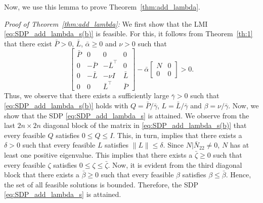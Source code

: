 \documentclass[9pt,shortpaper,twoside,web]{ieeecolor}
\newcommand{\bbma}{\begin{bmatrix}}
\newcommand{\ebma}{\end{bmatrix}}
\begin{document}
Now, we use this lemma to prove Theorem~\ref{thm:add_lambda}.

\textit{Proof of Theorem~\ref{thm:add_lambda}:}
 We first show that the LMI \eqref{eq:SDP_add_lambda_s(b)} is feasible. For this, it follows from Theorem~\ref{th:1} that there exist $\bar P>0$, $\bar L$, $\bar \alpha \geq 0$ and $\nu>0$ such that
\begin{equation}
\bbma \bar P & 0 & 0 & 0 \\ 0 & -\bar P & - \bar L^\top &  0 \\ 0 & -\bar L & -\nu I &  \bar L \\ 0 & 0 & \bar L^\top & \bar P \ebma
-\bar \alpha \bbma N & 0\\ 0 & 0 \ebma > 0.
\end{equation}
Thus, we observe that there exists a sufficiently large $\bar \gamma > 0$ such that \eqref{eq:SDP_add_lambda_s(b)} holds with $Q=\bar P/\bar \gamma$, $L=\bar L/\bar \gamma$ and $\beta=\nu/\bar \gamma$. Now, we show that the SDP \eqref{eq:SDP_add_lambda_s} is attained. We observe from the last $2n \times 2n$ diagonal block of the matrix in \eqref{eq:SDP_add_lambda_s(b)} that every feasible $Q$ satisfies $0\leq Q\leq I$. This, in turn, implies that there exists a $\delta>0$ such that every feasible $L$ satisfies $\|L\|\leq \delta$. Since $N|\bar{N}_{22}\neq0$, $N$ has at least one positive eigenvalue. This implies that there exists a $\bar \zeta \geq 0$ such that every feasible $\zeta$ satisfies $0\leq \zeta \leq \bar \zeta$. Now, it is evident from the third diagonal block that there exists a $\bar\beta \geq 0$ such that every feasible $\beta$ satisfies $\beta \leq \bar\beta$. Hence, the set of all feasible solutions is bounded. Therefore, the SDP \eqref{eq:SDP_add_lambda_s} is attained.
\end{document}

